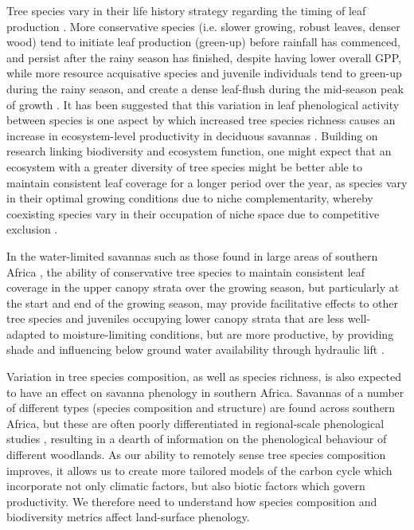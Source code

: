 \documentclass[11pt,a4paper]{article}
\begin{document}
Tree species vary in their life history strategy regarding the timing of leaf production \citep{Fenner1998, Cole2017, Medina1994}. More conservative species (i.e. slower growing, robust leaves, denser wood) tend to initiate leaf production (green-up) before rainfall has commenced, and persist after the rainy season has finished, despite having lower overall GPP, while more resource acquisative species and juvenile individuals tend to green-up during the rainy season, and create a dense leaf-flush during the mid-season peak of growth \citep{}. It has been suggested that this variation in leaf phenological activity between species is one aspect by which increased tree species richness causes an increase in ecosystem-level productivity in deciduous savannas \citep{}. Building on research linking biodiversity and ecosystem function, one might expect that an ecosystem with a greater diversity of tree species might be better able to maintain consistent leaf coverage for a longer period over the year, as species vary in their optimal growing conditions due to niche complementarity, whereby coexisting species vary in their occupation of niche space due to competitive exclusion \citep{}.

In the water-limited savannas such as those found in large areas of southern Africa \citep{}, the ability of conservative tree species to maintain consistent leaf coverage in the upper canopy strata over the growing season, but particularly at the start and end of the growing season, may provide facilitative effects to other tree species and juveniles occupying lower canopy strata that are less well-adapted to moisture-limiting conditions, but are more productive, by providing shade and influencing below ground water availability through hydraulic lift \citep{}. 

Variation in tree species composition, as well as species richness, is also expected to have an effect on savanna phenology in southern Africa. Savannas of a number of different types (species composition and structure) are found across southern Africa, but these are often poorly differentiated in regional-scale phenological studies \citep{}, resulting in a dearth of information on the phenological behaviour of different woodlands. As our ability to remotely sense tree species composition improves, it allows us to create more tailored models of the carbon cycle which incorporate not only climatic factors, but also biotic factors which govern productivity. We therefore need to understand how species composition and biodiversity metrics affect land-surface phenology. 
\end{document}
